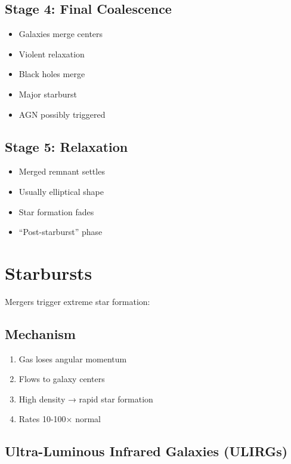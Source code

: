 \documentclass[
  11pt,
  letterpaper,
  twoside,
  openright]{book}
\providecommand{\tightlist}{%
  \setlength{\itemsep}{0pt}\setlength{\parskip}{0pt}}
\begin{document}
\subsection{Stage 4: Final Coalescence}\label{stage-4-final-coalescence}

\begin{itemize}
\tightlist
\item
  Galaxies merge centers
\item
  Violent relaxation
\item
  Black holes merge
\item
  Major starburst
\item
  AGN possibly triggered
\end{itemize}

\subsection{Stage 5: Relaxation}\label{stage-5-relaxation}

\begin{itemize}
\tightlist
\item
  Merged remnant settles
\item
  Usually elliptical shape
\item
  Star formation fades
\item
  ``Post-starburst'' phase
\end{itemize}

\section{Starbursts}\label{starbursts}

Mergers trigger extreme star formation:

\subsection{Mechanism}\label{mechanism-2}

\begin{enumerate}
\def\labelenumi{\arabic{enumi}.}
\tightlist
\item
  Gas loses angular momentum
\item
  Flows to galaxy centers
\item
  High density → rapid star formation
\item
  Rates 10-100× normal
\end{enumerate}

\subsection{Ultra-Luminous Infrared Galaxies
(ULIRGs)}\label{ultra-luminous-infrared-galaxies-ulirgs}
\end{document}
